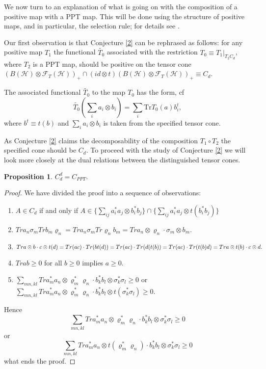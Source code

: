 \documentclass{amsart}
\theoremstyle{plain}
\theoremstyle{definition}
\newtheorem{prop}[thm]{Proposition}
\newcommand{\cH}{\mathcal{H}}
\newcommand{\Tr}{\mathrm{Tr}}
\begin{document}
We now turn to an  explanation of  what is going on with the composition of a positive map with a PPT map. This will be done using the structure of positive maps, and in particular, the selection rule; for  details see \cite{Maj}.

Our first observation is that Conjecture \ref{2} can be rephrased as follows: for any positive map $T_1$ the functional  $\tilde{T_0}$ associated with the restriction $T_0 \equiv T_1|_{T_2 C_d}$, where $T_2$ is a PPT map, should be positive on the tensor cone $\left(B(\cH) \otimes \mathcal{F}_T(\cH)\right)_+ \cap \left(id \otimes t\right)\left(B(\cH) \otimes \mathcal{F}_T(\cH)\right)_+ \equiv C_d$.

The associated functional $\tilde{T_0}$ to the map $T_0$ has the form, cf \cite{Maj}
\begin{equation}
\tilde{T_0}(\sum_i a_i \otimes b_i) = \sum_i \Tr T_0(a) b_i^t,
\end{equation}
where $b^t \equiv t(b)$ and $\sum_i a_i \otimes b_i$ is taken from the specified tensor cone.

As Conjecture \ref{2} claims the decomposability of the composition $T_1 \circ T_2$ the specified cone should be $C_d$.
To proceed with the study of Conjecture \ref{2} we will look more closely at the dual relations between the distinguished tensor cones. 
\begin{prop}
$C^d_d = C_{PPT}.$
\end{prop}
\begin{proof}
We have divided the proof into a sequence of observations:
\begin{enumerate}
\item $A \in C_d$ if and only if $A \in \{ \sum_{ij} a^*_i a_j \otimes b^*_ib_j \} \cap \{ \sum_{ij} a^*_i a_j \otimes t(b^*_i b_j) \}$
\item $Tr a_n\sigma_m Tr b_m \varrho_n = Tr a_n \sigma_m Tr \varrho_n b_m = Tr a_n \otimes \varrho_n \cdot \sigma_m \otimes b_m.$
\item $Tr a \otimes b \cdot c \otimes t(d) = Tr( ac) \cdot  Tr (bt(d)) = Tr( ac) \cdot  Tr (d(t(b))  \\
= Tr( ac) \cdot  Tr( t(b) d) = Tr a \otimes t(b) \cdot c \otimes d.$
\item $Tr ab \geq 0$ for all $b \geq 0$ implies $a \geq 0$.
\item $\sum_{mn,kl} Tr a^*_m a_n \otimes \varrho^*_m \varrho_n \cdot b^*_k b_l \otimes \sigma ^*_k \sigma_l \geq 0$
or
$\sum_{mn,kl} Tr a^*_m a_n \otimes \varrho^*_m \varrho_n \cdot b^*_k b_l \otimes t(\sigma ^*_k \sigma_l) \geq 0$.
\end{enumerate}
Hence
$$\sum_{mn,kl} Tr a^*_m a_n \otimes \varrho^*_m \varrho_n \cdot b^*_k b_l \otimes \sigma ^*_k \sigma_l \geq 0$$
or
$$\sum_{mn,kl} Tr a^*_m a_n \otimes t(\varrho^*_m \varrho_n) \cdot b^*_k b_l \otimes \sigma ^*_k \sigma_l \geq 0$$
what ends the proof.
\end{proof}
\end{document}
